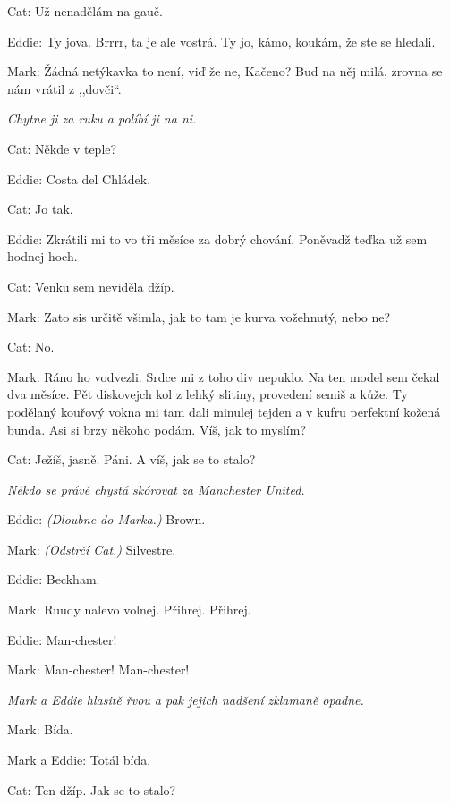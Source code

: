 \medskip
\noindent
Cat: Už nenadělám na gauč.

\medskip
\noindent
Eddie: Ty jova. Brrrr, ta je ale vostrá. Ty jo, kámo, koukám, že ste se hledali.

\medskip
\noindent
Mark: Žádná netýkavka to není, viď že ne, Kačeno? Buď na něj milá, zrovna se nám vrátil z ,,dovči``.

\medskip
\noindent
\textit{Chytne ji za ruku a políbí ji na ni.}

\medskip
\noindent
Cat: Někde v teple?

\medskip
\noindent
Eddie: Costa del Chládek.

\medskip
\noindent
Cat: Jo tak.

\medskip
\noindent
Eddie: Zkrátili mi to vo tři měsíce za dobrý chování. Poněvadž teďka už sem hodnej hoch.

\medskip
\noindent
Cat: Venku sem neviděla džíp.

\medskip
\noindent
Mark: Zato sis určitě všimla, jak to tam je kurva vožehnutý, nebo ne?

\medskip
\noindent
Cat: No.

\medskip
\noindent
Mark: Ráno ho vodvezli. Srdce mi z toho div nepuklo. Na ten model sem čekal dva měsíce. Pět diskovejch kol z lehký slitiny, provedení semiš a kůže. Ty podělaný kouřový vokna mi tam dali minulej tejden a v kufru perfektní kožená bunda. Asi si brzy někoho podám. Víš, jak to myslím?

\medskip
\noindent
Cat: Ježíš, jasně. Páni. A víš, jak se to stalo?

\medskip
\noindent
\textit{Někdo se právě chystá skórovat za Manchester United.}


\medskip
\noindent
Eddie: \textit{(Dloubne do Marka.)} Brown.

\medskip
\noindent
Mark: \textit{(Odstrčí Cat.)} Silvestre.

\medskip
\noindent
Eddie:	Beckham.

\medskip
\noindent
Mark:	Ruudy nalevo volnej. Přihrej. Přihrej. 

\medskip
\noindent
Eddie:	Man-chester!

\medskip
\noindent
Mark: Man-chester! Man-chester!

\medskip
\noindent
\textit{Mark a Eddie hlasitě řvou a pak jejich nadšení zklamaně opadne.}

\medskip
\noindent
Mark: Bída.

\medskip
\noindent
Mark a Eddie: Totál bída.

\medskip
\noindent
Cat: Ten džíp. Jak se to stalo?

